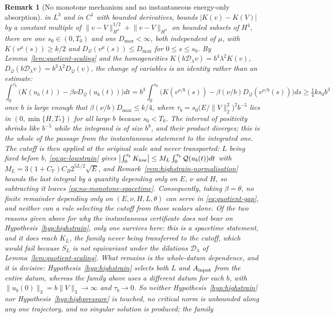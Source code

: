 \documentclass[11pt]{article}
\newtheorem{remark}[theorem]{Remark}
\theoremstyle{definition}
\theoremstyle{plain}
\newcommand{\norm}[1]{\lVert #1\rVert}
\begin{document}
\begin{remark}[No monotone mechanism and no instantaneous energy-only
absorption]
in $L^3$ and in $C^1$ with bounded derivatives, bounds $|K(v)-K(V)|$ by a
constant multiple of $\norm{v-V}_{H^4}^{1/2}+\norm{v-V}_{H^4}$ on bounded
subsets of $H^4$,
there are one $s_0\in(0,T_0)$ and one $D_{\max}<\infty$, both independent of
$\mu$, with $K(v^\mu(s))\geq k/2$ and $D_{\mathcal Q}(v^\mu(s))\leq D_{\max}$
for $0\leq s\leq s_0$.  By Lemma~\ref{lem:quotient-scaling} and the
homogeneities $K(b\mathcal D_\lambda v)=b^4\lambda^2K(v)$,
$D_{\mathcal Q}(b\mathcal D_\lambda v)=b^3\lambda^2D_{\mathcal Q}(v)$, the
change of variables is an identity rather than an estimate:
\[
 \int_0^{\tau_b}\bigl(K(u_b(t))-\beta\nu D_{\mathcal Q}(u_b(t))\bigr)dt
 =b^3\int_0^{s_0}\bigl(K(v^{\nu/b}(s))-\beta(\nu/b)D_{\mathcal Q}(v^{\nu/b}(s))\bigr)ds
 \geq\tfrac14ks_0b^3
\]
once $b$ is large enough that $\beta(\nu/b)D_{\max}\leq k/4$, where
$\tau_b=s_0\bigl(E/\norm V_2^2\bigr)^2b^{-5}$ lies in
$(0,\min\{H,T_*\})$ for all large $b$ because $s_0<T_0$.  The interval of
positivity shrinks like $b^{-5}$ while the integrand is of size $b^8$, and
their product diverges; this is the whole of the passage from the
instantaneous statement to the integrated one.  The cutoff is then applied at
the original scale and never transported: $L$ being fixed before $b$,
\eqref{eq:qe-lowstrain} gives
$\bigl|\int_0^{\tau_b}K_{\rm low}\bigr|\leq M_L\int_0^{\tau_b}\mathcal Q(u_b(t))dt$
with $M_L=3(1+C_{\mathbb P})C_B2^{5L/2}\sqrt E$, and
Remark~\ref{rem:highstrain-normalisation} bounds the last integral by a
quantity depending only on $E$, $\nu$ and $H$, so subtracting it leaves
\eqref{eq:no-monotone-spacetime}.  Consequently, taking $\beta=\theta$, no
finite remainder depending only on $(E,\nu,H,L,\theta)$ can serve in
\eqref{eq:quotient-gap},
and neither can a rule selecting the cutoff from those scalars alone.  Of
the two reasons given above for why the instantaneous certificate does not
bear on Hypothesis~\ref{hyp:highstrain}, only one survives here: this is a
spacetime statement, and it does reach $K_L$, the family never being
transferred to the cutoff, which would fail because $S_L$ is not equivariant
under the dilations $\mathcal D_\lambda$ of
Lemma~\ref{lem:quotient-scaling}.  What remains is the whole-datum
dependence, and it is decisive: Hypothesis~\ref{hyp:highstrain} selects both
$L$ and $A_{\rm input}$ from the entire datum, whereas the family above uses
a different datum for each $b$, with $\norm{u_b(0)}_3=b\norm V_3\to\infty$
and $\tau_b\to0$.  So neither Hypothesis~\ref{hyp:highstrain} nor
Hypothesis~\ref{hyp:highpressure} is touched, no critical norm is unbounded
along any one trajectory, and no singular solution is produced; the family

\end{remark}
\end{document}
